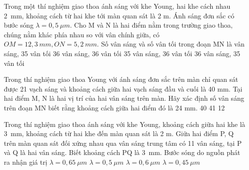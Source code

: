 \begin{ex}%
Trong một thí nghiệm giao thoa ánh sáng với khe Young, hai khe cách nhau 2\ mm, khoảng cách từ hai khe tới màn quan sát là 2 m. Ánh sáng đơn sắc có bước sóng $\lambda =0,5\ \mu m$. Cho M và N là hai điểm nằm trong trường giao thoa, chúng nằm khác phía nhau so với vân chính giữa, có $OM=12,3\ mm, ON=5,2\ mm$. Số vân sáng và số vân tối trong đoạn MN là
\choice
{ vân sáng, 35 vân tối}
{36 vân sáng, 36 vân tối}
{35 vân sáng, 36 vân tối}
{36 vân sáng, 35 vân tối}
\end{ex} 
\begin{ex}%
Trong thí nghiệm giao thoa Young với ánh sáng đơn sắc trên màn chỉ quan sát được 21 vạch sáng và khoảng cách giữa hai vạch sáng đầu và cuối là 40 mm. Tại hai điểm M, N là hai vị trí của hai vân sáng trên màn. Hãy xác định số vân sáng trên đoạn MN biết rằng khoảng cách giữa hai điểm đó là 24 mm.
\choice
{40}
{}
{41}
{12}
\end{ex} 
\begin{ex}%
Trong thí nghiệm giao thoa ánh sáng với khe Young, khoảng cách giữa hai khe là 3\ mm, khoảng cách từ hai khe đến màn quan sát là 2 m. Giữa hai điểm P, Q trên màn quan sát đối xứng nhau qua vân sáng trung tâm có 11 vân sáng, tại P và Q là hai vân sáng. Biết khoảng cách PQ là 3\ mm. Bước sóng do nguồn phát ra nhận giá trị
\choice
{$\lambda = 0,65\ \mu m$}
{$\lambda = 0,5\ \mu m$}
{$\lambda = 0,6\ \mu m$}
{\True $\lambda = 0,45\ \mu m$}
\end{ex} 

